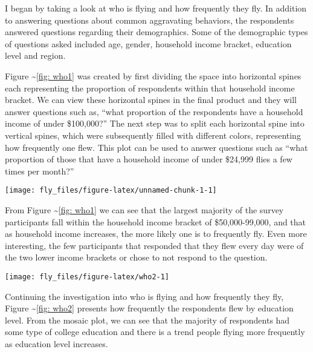 I began by taking a look at who is flying and how frequently they fly.
In addition to answering questions about common aggravating behaviors,
the respondents answered questions regarding their demographics. Some of
the demographic types of questions asked included age, gender, household
income bracket, education level and region.

Figure \textasciitilde{}\ref{fig: who1} was created by first dividing
the space into horizontal spines each representing the proportion of
respondents within that household income bracket. We can view these
horizontal spines in the final product and they will answer questions
such as, ``what proportion of the respondents have a household income of
under \$100,000?'' The next step was to split each horizontal spine into
vertical spines, which were subsequently filled with different colors,
representing how frequently one flew. This plot can be used to answer
questions such as ``what proportion of those that have a household
income of under \$24,999 flies a few times per month?''

\begin{Schunk}


\begin{center}\texttt{[image: fly\_files/figure-latex/unnamed-chunk-1-1]} \end{center}

\end{Schunk}

From Figure \textasciitilde{}\ref{fig: who1} we can see that the largest
majority of the survey participants fall within the household income
bracket of \$50,000-99,000, and that as household income increases, the
more likely one is to frequently fly. Even more interesting, the few
participants that responded that they flew every day were of the two
lower income brackets or chose to not respond to the question.

\begin{Schunk}


\begin{center}\texttt{[image: fly\_files/figure-latex/who2-1]} \end{center}

\end{Schunk}

Continuing the investigation into who is flying and how frequently they
fly, Figure \textasciitilde{}\ref{fig: who2} presents how frequently the
respondents flew by education level. From the mosaic plot, we can see
that the majority of respondents had some type of college education and
there is a trend people flying more frequently as education level
increases.

